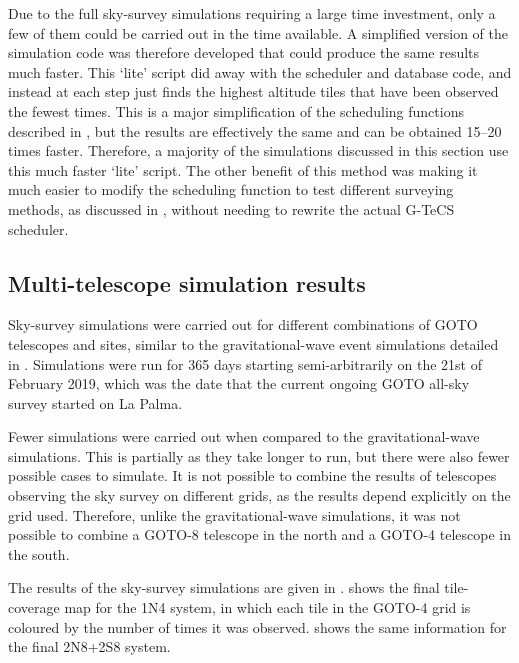 \begin{colsection}
\begin{colsection}
Due to the full sky-survey simulations requiring a large time investment, only a few of them could be carried out in the time available. A simplified version of the simulation code was therefore developed that could produce the same results much faster. This `lite' script did away with the scheduler and database code, and instead at each step just finds the highest altitude tiles that have been observed the fewest times. This is a major simplification of the scheduling functions described in , but the results are effectively the same and can be obtained 15--20 times faster. Therefore, a majority of the simulations discussed in this section use this much faster `lite' script. The other benefit of this method was making it much easier to modify the scheduling function to test different surveying methods, as discussed in , without needing to rewrite the actual G-TeCS scheduler.

\end{colsection}


\subsection{Multi-telescope simulation results}
\label{sec:survey_sim_results}
\begin{colsection}

Sky-survey simulations were carried out for different combinations of GOTO telescopes and sites, similar to the gravitational-wave event simulations detailed in . Simulations were run for 365 days starting semi-arbitrarily on the 21st of February 2019, which was the date that the current ongoing GOTO all-sky survey started on La Palma.

Fewer simulations were carried out when compared to the gravitational-wave simulations. This is partially as they take longer to run, but there were also fewer possible cases to simulate. It is not possible to combine the results of telescopes observing the sky survey on different grids, as the results depend explicitly on the grid used. Therefore, unlike the gravitational-wave simulations, it was not possible to combine a GOTO-8 telescope in the north and a GOTO-4 telescope in the south.

The results of the sky-survey simulations are given in .  shows the final tile-coverage map for the 1N4 system, in which each tile in the GOTO-4 grid is coloured by the number of times it was observed.  shows the same information for the final 2N8+2S8 system.


\end{colsection}
\end{colsection}
